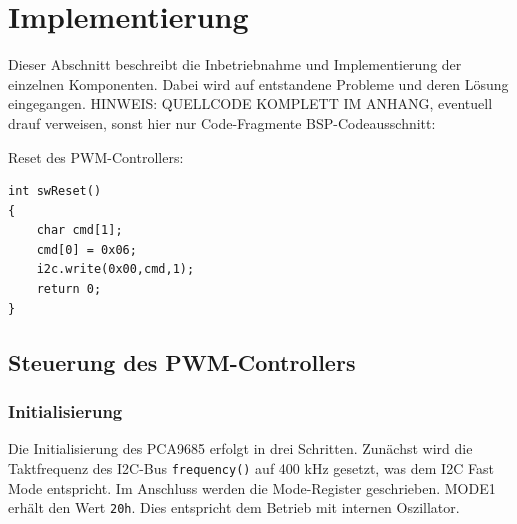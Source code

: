\documentclass[a4paper,12pt]{scrartcl}
\begin{document}
\clearpage
\section{Implementierung}
Dieser Abschnitt beschreibt die Inbetriebnahme und Implementierung der einzelnen Komponenten. Dabei wird auf entstandene Probleme und deren Lösung eingegangen.
HINWEIS: QUELLCODE KOMPLETT IM ANHANG, eventuell drauf verweisen, sonst hier nur Code-Fragmente
BSP-Codeausschnitt:

Reset des PWM-Controllers:
\begin{lstlisting}[captionpos=b, caption=Code-Ausschnitt: Software-Reset des PWM-Controllers, label=codeswreset]
int swReset()
{
    char cmd[1];
    cmd[0] = 0x06;
    i2c.write(0x00,cmd,1);
    return 0;
}
\end{lstlisting}


\subsection{Steuerung des PWM-Controllers}

\subsubsection{Initialisierung}
Die Initialisierung des PCA9685 erfolgt in drei Schritten. Zunächst wird die Taktfrequenz des I2C-Bus  \texttt{frequency()} auf 400 kHz gesetzt, was dem I2C Fast Mode entspricht. Im Anschluss werden die Mode-Register geschrieben. MODE1 erhält den Wert \texttt{20h}. Dies entspricht dem Betrieb mit internen Oszillator.
\end{document}
